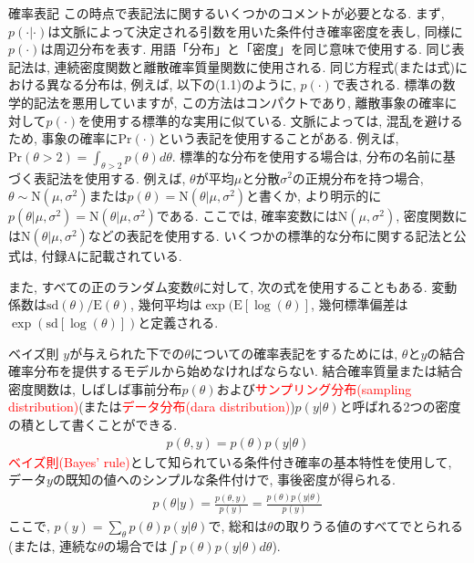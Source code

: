 \documentclass[10pt,dvipdfmx,a4]{beamer}
\newcommand{\eq}[1]{\begin{align}#1\end{align}}
\newcommand{\eqn}[1]{\begin{align*}#1\end{align*}}
\newcommand{\tcr}[1]{\textcolor{red}{#1}}
\begin{document}
\begin{frame}{確率表記}
この時点で表記法に関するいくつかのコメントが必要となる.
まず, $p(\cdot|\cdot)$は文脈によって決定される引数を用いた条件付き確率密度を表し, 同様に$p(\cdot)$は周辺分布を表す.
用語「分布」と「密度」を同じ意味で使用する.
同じ表記法は, 連続密度関数と離散確率質量関数に使用される.
同じ方程式(または式)における異なる分布は, 例えば, 以下の(1.1)のように, $p(\cdot)$で表される.
標準の数学的記法を悪用していますが, この方法はコンパクトであり, 離散事象の確率に対して$p(\cdot)$を使用する標準的な実用に似ている.
文脈によっては, 混乱を避けるため, 事象の確率に$\text{Pr}(\cdot)$という表記を使用することがある.
例えば, $\text{Pr}(\theta>2)=\int_{\theta>2} p(\theta)d\theta$.
標準的な分布を使用する場合は, 分布の名前に基づく表記法を使用する.
例えば, $\theta$が平均$\mu$と分散$\sigma^2$の正規分布を持つ場合, $\theta \sim \text{N}(\mu,\sigma^2)$または$p(\theta)=\text{N}(\theta|\mu,\sigma^2)$と書くか, より明示的に$p(\theta|\mu,\sigma^2)=\text{N}(\theta|\mu,\sigma^2)$である.
ここでは, 確率変数には$\text{N}(\mu,\sigma^2)$, 密度関数には$\text{N}(\theta|\mu,\sigma^2)$などの表記を使用する.
いくつかの標準的な分布に関する記法と公式は, 付録Aに記載されている.

また, すべての正のランダム変数$\theta$に対して, 次の式を使用することもある.
変動係数は$\text{sd}(\theta)/\text{E}(\theta)$, 幾何平均は$\exp(\text{E}[\log(\theta)]$, 幾何標準偏差は$\exp(\text{sd}[\log(\theta)])$と定義される.

\end{frame}


\begin{frame}{ベイズ則}
$y$が与えられた下での$\theta$についての確率表記をするためには, $\theta$と$y$の結合確率分布を提供するモデルから始めなければならない.
結合確率質量または結合密度関数は, しばしば事前分布$p(\theta)$および\tcr{サンプリング分布(sampling distribution)}(または\tcr{データ分布(dara distribution)})$p(y|\theta)$と呼ばれる2つの密度の積として書くことができる.
\eqn{p(\theta,y)=p(\theta)p(y|\theta)}
\tcr{ベイズ則(Bayes' rule)}として知られている条件付き確率の基本特性を使用して, データ$y$の既知の値へのシンプルな条件付けで, 事後密度が得られる.
\eq{p(\theta|y)=\frac{p(\theta,y)}{p(y)}=\frac{p(\theta)p(y|\theta)}{p(y)}}
ここで, $p(y)=\sum_{\theta}p(\theta)p(y|\theta)$で, 総和は$\theta$の取りうる値のすべてでとられる(または, 連続な$\theta$の場合では$\int p(\theta)p(y|\theta)d\theta$).
\end{frame}
\end{document}
